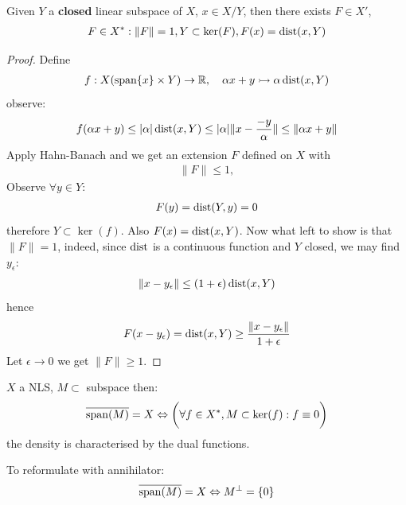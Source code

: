 \begin{corollary}
	Given $Y$ a \textbf{closed} linear subspace of $X$, $x \in X \slash Y$, then
there exists $F \in X'$,
	\begin{align*}
		F \in X^*: \|F\| = 1, Y \subset \ker(F), F(x) = \operatorname*{dist}(x, Y)
	\end{align*}
\end{corollary}
\begin{proof}
	Define
\begin{align*}
	f: X (\operatorname*{span}\{x\} \times Y) \rightarrow \mathbb{R}, \quad
	\alpha x + y \rightarrowtail \alpha \operatorname*{dist}(x, Y)
\end{align*}
observe:
\begin{align*}
	f(\alpha x + y) \le  |\alpha| \operatorname*{dist}(x, Y) \le |\alpha| \|x - \frac{-y}{\alpha }\| \le \|\alpha x + y\|
\end{align*}
Apply Hahn-Banach and we get an extension $F$ defined on $X$ with  
\begin{align*}
	\|F\| \le 1, 
\end{align*}
Observe $\forall y \in Y$:
\begin{align*}
	F(y) = \operatorname*{dist}(Y, y) = 0
\end{align*}
therefore $Y \subset \ker(f)$. Also $F(x) = \operatorname*{dist}(x, Y)$.
Now what left to show is that $\|F\| = 1$, indeed, since $\operatorname*{dist}$ is a continuous function and $Y$ closed, we may find $y_\epsilon$:
\begin{align*}
	\|x - y_\epsilon \| \le (1 + \epsilon) \operatorname*{dist}(x, Y)
\end{align*}
hence
\begin{align*}
	F(x - y_\epsilon) = \operatorname*{dist}(x, Y) \geq\frac{\|x - y_\epsilon\|}{1 + \epsilon}
\end{align*}
Let $\epsilon \rightarrow 0$ we get $\|F\| \geq 1$.
\end{proof}

\begin{corollary}
	$X$ a NLS, $M \subset $ subspace then:
	\begin{align*}
		\overline{\operatorname*{span}(M)} = X \Leftrightarrow \bigg( \forall f \in X^*, M \subset \ker(f): f \equiv 0 \bigg)
	\end{align*}
	the density is characterised by the dual functions.
\end{corollary}
\begin{remark}
To reformulate with annihilator:
\begin{align*}
	\overline{\operatorname*{span}(M)} = X \Leftrightarrow {} M^\perp = \{0\}
\end{align*}
\end{remark}

